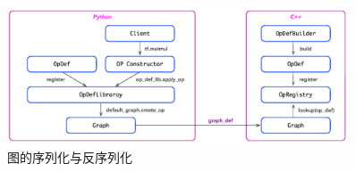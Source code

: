 \begin{content}

\begin{figure}[!htbp]
\centering
\includegraphics[width=0.9\textwidth]{figures/py-graph-creation.png}
\caption{图的序列化与反序列化}
 \label{fig:py-graph-creation}
\end{figure}

\end{content}

